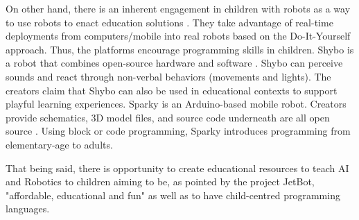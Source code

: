 \documentclass[sigconf]{acmart}
\begin{document}
On other hand, there is an inherent engagement in children with robots as a way to use robots to enact education solutions \cite{druga2019}. 
They take advantage of real-time deployments from computers/mobile into real robots based on the Do-It-Yourself approach. 
Thus, the platforms encourage programming skills in children. 
Shybo is a robot that combines open-source hardware and software \cite{Lupetti2017}.
Shybo can perceive sounds and react through non-verbal behaviors (movements and lights). 
The creators claim that Shybo can also be used in educational contexts to support playful learning experiences. 
Sparky is an Arduino-based mobile robot. Creators provide schematics, 3D model files, and source code underneath are all open source \cite{sparky2012}. 
Using block or code programming, Sparky introduces programming from elementary-age to adults.

That being said, there is opportunity to create educational resources to teach AI and Robotics to children aiming to be, as pointed by the project JetBot, "affordable, educational and fun" \cite{nanoJetBot:2019} as well as to have child-centred programming languages.




\end{document}

